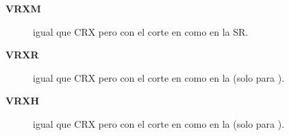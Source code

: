\begin{description}
\item[\textbf{VRXM}]  igual que CRX pero con el corte en {\met} como en la SR.
\item[\textbf{VRXR}]  igual que CRX pero con el corte en {\rt} como en la {\SRL} (solo para {\SRL}).
\item[\textbf{VRXH}]  igual que CRX pero con el corte en {\HT} como en la {\SRH} (solo para {\SRH}).
\end{description}

\begin{table}[!htbp]
  \centering

  \caption{Selección para las regiones de validación utilizadas para validar la extrapolación
    de los fondos de {\wgam}, {\ttgam}, entre las CR a las regiones de señal
    {\SRL} y {\SRH}}
  \label{tab:bkg_vrs1}


\end{table}



